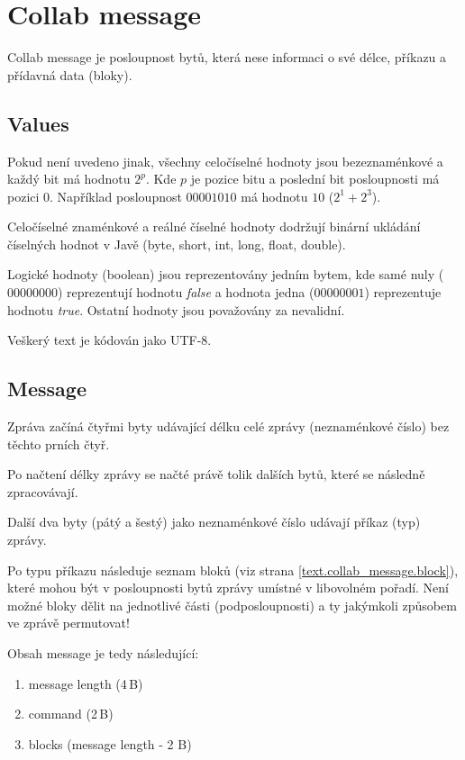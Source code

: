 \documentclass[12pt,oneside,a4paper]{report}
\begin{document}
\chapter{Collab message}
\label{text.collab_message}

Collab message je posloupnost bytů, která nese informaci o své délce, příkazu a přídavná data (bloky).

\section{Values}

Pokud není uvedeno jinak, všechny celočíselné hodnoty jsou bezeznaménkové a každý bit má hodnotu $2^{p}$. Kde $p$ je pozice bitu a poslední bit posloupnosti má pozici $0$. Například posloupnost $00001010$ má hodnotu $10$ ($2^1 + 2^3$).

Celočíselné znaménkové a reálné číselné hodnoty dodržují binární ukládání číselných hodnot v Javě (byte, short, int, long, float, double).

Logické hodnoty (boolean) jsou reprezentovány jedním bytem, kde samé nuly ($00000000$) reprezentují hodnotu \emph{false} a hodnota jedna ($00000001$) reprezentuje hodnotu \emph{true}. Ostatní hodnoty jsou považovány za nevalidní.

Veškerý text je kódován jako UTF-8.

\section{Message}

Zpráva začíná čtyřmi byty udávající délku celé zprávy (neznaménkové číslo) bez těchto prních čtyř.

Po načtení délky zprávy se načté právě tolik dalších bytů, které se následně zpracovávají.

Další dva byty (pátý a šestý) jako neznaménkové číslo udávají příkaz (typ) zprávy.

Po typu příkazu následuje seznam bloků (viz strana \ref{text.collab_message.block}), které mohou být v posloupnosti bytů zprávy umístné v libovolném pořadí. Není možné bloky dělit na jednotlivé části (podposloupnosti) a ty jakýmkoli způsobem ve zprávě permutovat!

Obsah message je tedy následující:

\begin{enumerate}
	\item message length (4\,{}B)
	\item command (2\,{}B)
	\item blocks (message length - 2 B)
\end{enumerate}
\end{document}
